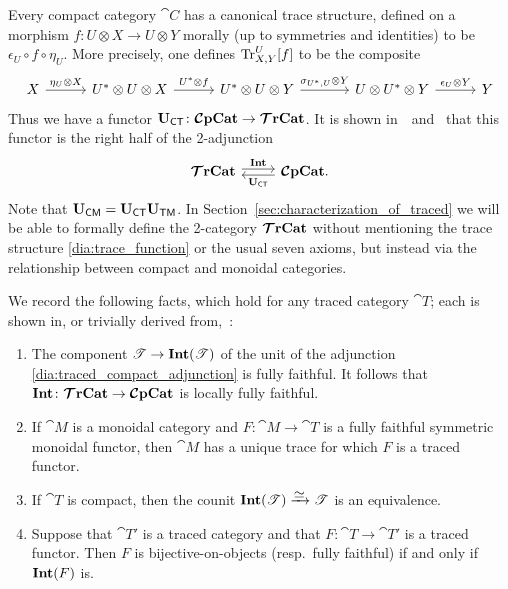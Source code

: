\documentclass[11pt,oneside,article]{memoir}
\begin{document}
Every compact category $\cat{C}$ has a canonical trace structure, defined on a morphism $f\colon
U\otimes X\to U\otimes Y$ morally (up to symmetries and identities) to be $\epsilon_U\circ f\circ
\eta_U$. More precisely, one defines $\operatorname{Tr}^U_{X,Y}[f]$ to be the composite
\begin{equation*}
\begin{tikzcd}[column sep=29pt]
	X\ar[r,"\eta_U\otimes X"]&
	U^*\otimes U\otimes X\ar[r,"U^*\otimes f"]&
	U^*\otimes U\otimes Y\ar[r,"\sigma_{U^*,U}\otimes Y"]&[6pt]
	U\otimes U^*\otimes Y\ar[r,"\epsilon_U\otimes Y"]&
	Y
\end{tikzcd}
\end{equation*}
Thus we have a functor $\mathbf{U}_{\mathsf{CT}}\colon\bm{\mathcal{C}}\mathbf{pCat}\to\bm{\mathcal{T}}\mathbf{rCat}$. It is shown in~\cite{JoyalStreetVerity}~and~\cite{HK} that this functor is the right half of the 2-adjunction
\begin{equation}
      \label{dia:traced_compact_adjunction}
   \begin{tikzcd}
      \TTrCat\arrow[r,shift left=.5ex, "\Int"]&\CCompCat\arrow[l,shift left=.5ex,"\UCT"].
   \end{tikzcd}
\end{equation}
Note that $\mathbf{U}_{\mathsf{CM}}=\mathbf{U}_{\mathsf{CT}}\mathbf{U}_{\mathsf{TM}}$. In Section~\ref{sec:characterization_of_traced} we will be able to formally define the 2-category
$\bm{\mathcal{T}}\mathbf{rCat}$ without mentioning the trace structure \eqref{dia:trace_function} or the usual seven axioms, but instead via the
relationship between compact and monoidal categories.


\begin{remark}
      \label{rmk:fully_faithful_and_trace}
We record the following facts, which hold for any traced category $\cat{T}$; each is shown in, or trivially derived from,~\cite{JoyalStreetVerity}:
   \begin{enumerate}[label={\upshape\roman*}.]
      \item The component $\mathscr{T}\to\mathbf{Int}(\mathscr{T})$ of the unit of the adjunction
         \eqref{dia:traced_compact_adjunction} is fully faithful. It follows that
         $\mathbf{Int}\colon\bm{\mathcal{T}}\mathbf{rCat}\to\bm{\mathcal{C}}\mathbf{pCat}$ is locally fully faithful.
      \item If $\cat{M}$ is a monoidal category and $F\colon\cat{M}\to\cat{T}$ is a fully faithful
         symmetric monoidal functor, then $\cat{M}$ has a unique trace for which $F$ is a traced
         functor.
      \item If $\cat{T}$ is compact, then the counit
         $\Int(\cat{T})\To{\raisebox{-1ex}{$\equiv$}}\cat{T}$ is an equivalence.
      \item Suppose that $\cat{T'}$ is a traced category and that $F\colon \cat{T}\to \cat{T}'$ is a
         traced functor. Then $F$ is bijective-on-objects (resp.\ fully faithful) if and only if
         $\mathbf{Int}(F)$ is.
   \end{enumerate}
\end{remark}
\end{document}

